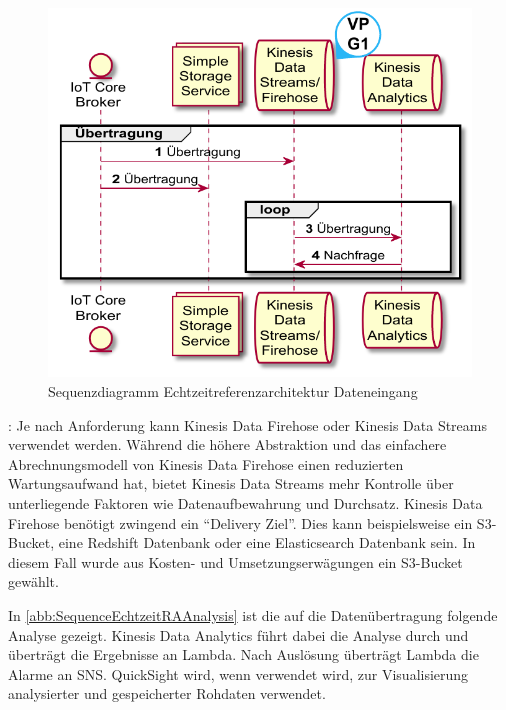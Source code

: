 \begin{figure}[H]
\centering
\includegraphics[height=0.4\textheight]{graphics/echtzeit-ra-ingestion.pdf}
\caption{Sequenzdiagramm Echtzeitreferenzarchitektur Dateneingang}
\label{abb:SequenceEchtzeitRAIngestion}
\end{figure}

: Je nach Anforderung kann Kinesis Data Firehose oder Kinesis Data Streams verwendet werden. Während die höhere Abstraktion und das einfachere Abrechnungsmodell von Kinesis Data Firehose einen reduzierten Wartungsaufwand hat, bietet Kinesis Data Streams mehr Kontrolle über unterliegende Faktoren wie Datenaufbewahrung und Durchsatz. Kinesis Data Firehose benötigt zwingend ein \enquote{Delivery Ziel}. Dies kann beispielsweise ein \ac{S3}-Bucket, eine Redshift Datenbank oder eine Elasticsearch Datenbank sein. In diesem Fall wurde aus Kosten- und Umsetzungserwägungen ein \ac{S3}-Bucket gewählt.

In \autoref{abb:SequenceEchtzeitRAAnalysis} ist die auf die Datenübertragung folgende Analyse gezeigt. Kinesis Data Analytics führt dabei die Analyse durch und überträgt die Ergebnisse an Lambda. Nach Auslösung überträgt Lambda die Alarme an \ac{SNS}. QuickSight wird, wenn  verwendet wird, zur Visualisierung analysierter und gespeicherter Rohdaten verwendet.

